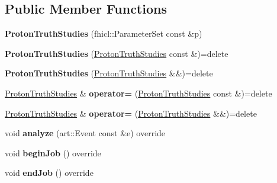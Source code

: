 \subsection*{Public Member Functions}
\begin{DoxyCompactItemize}
\item 
{\bfseries Proton\+Truth\+Studies} (fhicl\+::\+Parameter\+Set const \&p)\hypertarget{classProtonTruthStudies_acb45ae09f4c73fe459dd3961f53da487}{}\label{classProtonTruthStudies_acb45ae09f4c73fe459dd3961f53da487}

\item 
{\bfseries Proton\+Truth\+Studies} (\hyperlink{classProtonTruthStudies}{Proton\+Truth\+Studies} const \&)=delete\hypertarget{classProtonTruthStudies_a8a3b737c0a0ede99cb18b5449007193e}{}\label{classProtonTruthStudies_a8a3b737c0a0ede99cb18b5449007193e}

\item 
{\bfseries Proton\+Truth\+Studies} (\hyperlink{classProtonTruthStudies}{Proton\+Truth\+Studies} \&\&)=delete\hypertarget{classProtonTruthStudies_a0d886dadf4fb03121a02971d70c797d0}{}\label{classProtonTruthStudies_a0d886dadf4fb03121a02971d70c797d0}

\item 
\hyperlink{classProtonTruthStudies}{Proton\+Truth\+Studies} \& {\bfseries operator=} (\hyperlink{classProtonTruthStudies}{Proton\+Truth\+Studies} const \&)=delete\hypertarget{classProtonTruthStudies_ac5238bf49bd186c572e8a34aa9a38f9f}{}\label{classProtonTruthStudies_ac5238bf49bd186c572e8a34aa9a38f9f}

\item 
\hyperlink{classProtonTruthStudies}{Proton\+Truth\+Studies} \& {\bfseries operator=} (\hyperlink{classProtonTruthStudies}{Proton\+Truth\+Studies} \&\&)=delete\hypertarget{classProtonTruthStudies_a01b347b069e00517ac8ee9e4b9a207ea}{}\label{classProtonTruthStudies_a01b347b069e00517ac8ee9e4b9a207ea}

\item 
void {\bfseries analyze} (art\+::\+Event const \&e) override\hypertarget{classProtonTruthStudies_a3eb819554253429f62473a4690bec53d}{}\label{classProtonTruthStudies_a3eb819554253429f62473a4690bec53d}

\item 
void {\bfseries begin\+Job} () override\hypertarget{classProtonTruthStudies_a80d8c2e71f8c307cbf1dcd7aad211e8a}{}\label{classProtonTruthStudies_a80d8c2e71f8c307cbf1dcd7aad211e8a}

\item 
void {\bfseries end\+Job} () override\hypertarget{classProtonTruthStudies_a337810836a8d96a20669857d85f36e35}{}\label{classProtonTruthStudies_a337810836a8d96a20669857d85f36e35}


\end{DoxyCompactItemize}
